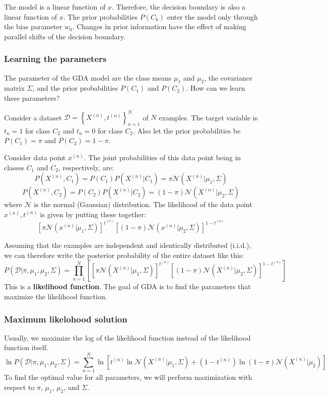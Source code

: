 \documentclass[a4paper,12pt]{article}
\begin{document}
The model is a linear function of $x$. Therefore, the decision boundary is also a linear function of $x$. The prior probabilities $P(C_k)$ enter the model only through the bias parameter $w_0$. Changes in prior information have the effect of making parallel shifts of the decision boundary. 

\subsubsection{Learning the parameters}

The parameter of the GDA model are the class means $\mu_1$ and $\mu_2$, the covariance matrix $\Sigma$, and the prior probabilities $P(C_1)$ and $P(C_2)$. How can we learn these parameters? 

Consider a dataset $\mathcal{D} = \left\{X^{(n)}, t^{(n)}\right\}_{n=1}^N$ of $N$ examples. The target variable is $t_n=1$ for class $C_2$ and $t_n=0$ for class $C_2$. Also let the prior probabilities be $P(C_1) = \pi$ and $P(C_2) = 1 - \pi$. 

Consider data point $x^{(n)}$. The joint probabilities of this data point being in classes $C_1$ and $C_2$, respectively, are: 
$$P(X^{(n)}, C_1) = P(C_1) P(X^{(n)}|C_1) = \pi \mathcal{N}(X^{(n)}|\mu_1, \Sigma)$$
$$P(X^{(n)}, C_2) = P(C_2) P(X^{(n)}|C_2) = (1-\pi) \mathcal{N}(X^{(n)}|\mu_2, \Sigma)$$
where $\mathcal{N}$ is the normal (Gaussian) distribution. The likelihood of the data point $x^{(n)}, t^{(n)}$ is given by putting these together: 
$$\left[\pi \mathcal{N}(x^{(n)}|\mu_1, \Sigma)\right]^{t^{(n)}} \left[(1-\pi) \mathcal{N}(x^{(n)}|\mu_2, \Sigma)\right]^{1-t^{(n)}}$$

Assuming that the examples are independent and identically distributed (i.i.d.), we can therefore write the posterior probability of the entire dataset like this: 
$$P(\mathcal{D} | \pi, \mu_1, \mu_2, \Sigma) = \prod_{n=1}^N \left[\left[\pi \mathcal{N}(X^{(n)}|\mu_1, \Sigma)\right]^{t^{(n)}} \left[(1-\pi) \mathcal{N}(X^{(n)}|\mu_2, \Sigma)\right]^{1-t^{(n)}}\right]$$
This is a \textbf{likelihood function}. The goal of GDA is to find the parameters that maximize the likelihood function. 

\subsubsection{Maximum likelohood solution}

Usually, we maximize the log of the likelihood function instead of the likelihood function itself. 
$$\ln P(\mathcal{D} | \pi, \mu_1, \mu_2, \Sigma) = \sum_{n=1}^N \ln \left[t^{(n)} \ln \mathcal{N}(X^{(n)}|\mu_1, \Sigma) + (1-t^{(n)})\ln (1-\pi) \mathcal{N}(X^{(n)}|\mu_2)\right]$$
To find the optimal value for all parameters, we will perform maximization with respect to $\pi$, $\mu_1$, $\mu_2$, and $\Sigma$. 
\end{document}
